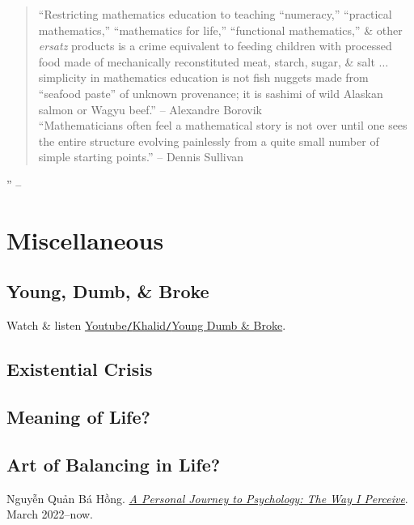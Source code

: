\documentclass[oneside]{book}
\numberwithin{equation}{section}
\begin{document}
\begin{quotation}
	``Restricting mathematics education to teaching ``numeracy,'' ``practical mathematics,'' ``mathematics for life,'' ``functional mathematics,'' \& other \textit{ersatz} products is a crime equivalent to feeding children with processed food made of mechanically reconstituted meat,  starch, sugar, \& salt $\ldots$ simplicity in mathematics education is not fish nuggets made from ``seafood paste'' of unknown provenance; it is sashimi of wild Alaskan salmon or Wagyu beef.'' -- Alexandre Borovik\\
	
	``Mathematicians often feel a mathematical story is not over until one sees the entire structure evolving painlessly from a quite small number of simple starting points.'' -- Dennis Sullivan
\end{quotation}
'' -- \cite[Preface, pp. vii--xii]{Kossak_Ording2017}


\chapter{Miscellaneous}

\section{Young, Dumb, \& Broke}
Watch \& listen \href{https://www.youtube.com/watch?v=IPfJnp1guPc}{Youtube\texttt{/}Khalid\texttt{/}Young Dumb \& Broke}.

\section{Existential Crisis}

\section{Meaning of Life?}

\section{Art of Balancing in Life?}



\begin{thebibliography}{99}
	  Nguyễn Quản Bá Hồng. \href{https://github.com/NQBH/hobby/blob/master/psychology/NQBH_a_personal_journey_to_psychology.pdf}{\textit{A Personal Journey to Psychology: The Way I Perceive}}. March 2022--now.
\end{thebibliography}


\printbibliography[heading=bibintoc]
	
\end{document}
